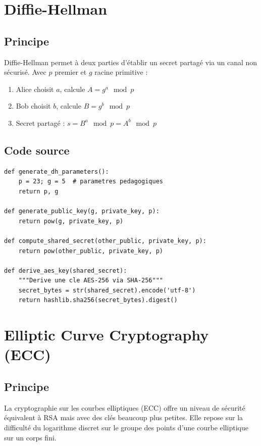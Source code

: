 \documentclass[12pt,a4paper]{report}
\begin{document}
\section{Diffie-Hellman}

\subsection{Principe}
Diffie-Hellman permet à deux parties d'établir un secret partagé via un canal non sécurisé. Avec $p$ premier et $g$ racine primitive :
\begin{enumerate}
    \item Alice choisit $a$, calcule $A = g^a \mod p$
    \item Bob choisit $b$, calcule $B = g^b \mod p$
    \item Secret partagé : $s = B^a \mod p = A^b \mod p$
\end{enumerate}

\subsection{Code source}
\begin{lstlisting}[style=python,caption=Diffie\_Hellman.py]
def generate_dh_parameters():
    p = 23; g = 5  # parametres pedagogiques
    return p, g

def generate_public_key(g, private_key, p):
    return pow(g, private_key, p)

def compute_shared_secret(other_public, private_key, p):
    return pow(other_public, private_key, p)

def derive_aes_key(shared_secret):
    """Derive une cle AES-256 via SHA-256"""
    secret_bytes = str(shared_secret).encode('utf-8')
    return hashlib.sha256(secret_bytes).digest()
\end{lstlisting}

\section{Elliptic Curve Cryptography (ECC)}

\subsection{Principe}
La cryptographie sur les courbes elliptiques (ECC) offre un niveau de sécurité équivalent à RSA mais avec des clés beaucoup plus petites. Elle repose sur la difficulté du logarithme discret sur le groupe des points d'une courbe elliptique sur un corps fini.
\end{document}
